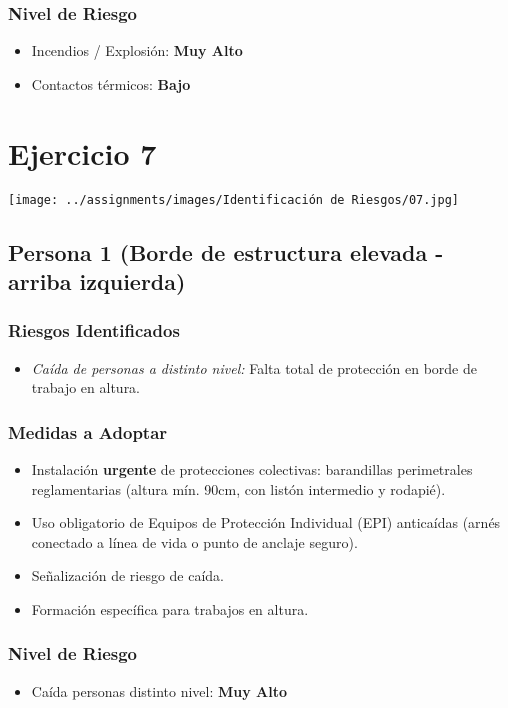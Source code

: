 \documentclass[12pt,a4paper]{article}
\begin{document}
	\subsubsection{Nivel de Riesgo}
	\begin{itemize}
		\item Incendios / Explosión: \textbf{Muy Alto}
		\item Contactos térmicos: \textbf{Bajo}
	\end{itemize}
	
	\section{Ejercicio 7}
	
	\texttt{[image: ../assignments/images/Identificación de Riesgos/07.jpg]}
	
	\subsection{Persona 1 (Borde de estructura elevada - arriba izquierda)}
	
	\subsubsection{Riesgos Identificados}
	\begin{itemize}
		\item \textit{Caída de personas a distinto nivel:} Falta total de protección en borde de trabajo en altura.
	\end{itemize}
	
	\subsubsection{Medidas a Adoptar}
	\begin{itemize}
		\item Instalación \textbf{urgente} de protecciones colectivas: barandillas perimetrales reglamentarias (altura mín. 90cm, con listón intermedio y rodapié).
		\item Uso obligatorio de Equipos de Protección Individual (EPI) anticaídas (arnés conectado a línea de vida o punto de anclaje seguro).
		\item Señalización de riesgo de caída.
		\item Formación específica para trabajos en altura.
	\end{itemize}
	
	\subsubsection{Nivel de Riesgo}
	\begin{itemize}
		\item Caída personas distinto nivel: \textbf{Muy Alto}
	\end{itemize}
	
\end{document}
